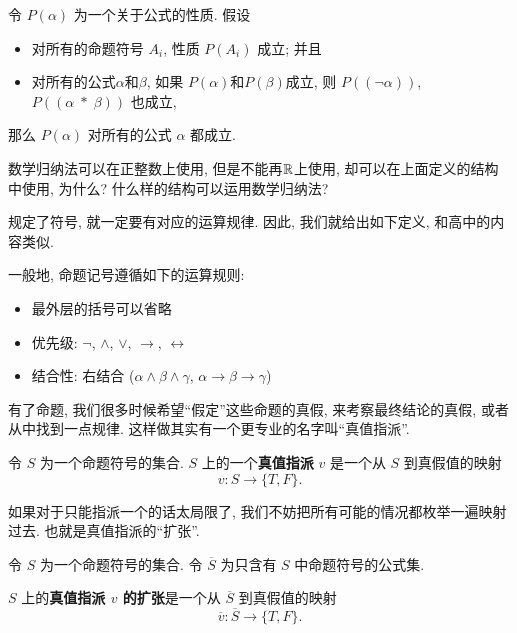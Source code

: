     \begin{theorem}[归纳原理]
        令 $P(\alpha)$ 为一个关于公式的性质. 假设
        \begin{itemize}
          \item 对所有的命题符号 $A_{i}$, 性质 $P(A_{i})$ 成立; 并且
          \item 对所有的公式$\alpha$和$\beta$, 如果 $P(\alpha)$和$P(\beta)$成立,
            则 $P((\lnot \alpha))$, $P((\alpha \;{\ast}\; \beta))$ 也成立,
        \end{itemize}
        那么 $P(\alpha)$ 对所有的公式 $\alpha$ 都成立. 
      \end{theorem}
      \begin{bonus}
        数学归纳法可以在正整数上使用, 但是不能再$\mathbb{R}$上使用, 却可以在上面定义的结构中使用, 为什么? 什么样的结构可以运用数学归纳法?
      \end{bonus}
      
      规定了符号, 就一定要有对应的运算规律. 因此, 我们就给出如下定义, 和高中的内容类似. 

      \begin{definition}[命题符号的运算规则]
        一般地, 命题记号遵循如下的运算规则: 
        \begin{itemize}
            \setlength{\itemsep}{6pt}
            \item 最外层的括号可以省略
            \item 优先级: $\lnot$, $\land$, $\lor$, $\to$, $\leftrightarrow$
            \item 结合性: 右结合 ($\alpha \land \beta \land \gamma$,
              $\alpha \to \beta \to \gamma$)
          \end{itemize}
        
      \end{definition}
      
      有了命题, 我们很多时候希望``假定''这些命题的真假, 来考察最终结论的真假, 或者从中找到一点规律. 这样做其实有一个更专业的名字叫``真值指派''. 

      \begin{definition}[真值指派 ($v$)]
        令 $S$ 为一个命题符号的集合. 
        $S$ 上的一个{\bf 真值指派} $v$ 是一个从 $S$ 到真假值的映射
        \[
          v: S \to \{T, F\}.
        \]
      \end{definition}

      如果对于只能指派一个的话太局限了, 我们不妨把所有可能的情况都枚举一遍映射过去. 也就是真值指派的``扩张''.

      \begin{definition}
        令 $S$ 为一个命题符号的集合. 
        令 $\overline{S}$ 为只含有 $S$ 中命题符号的公式集. 
    
        $S$ 上的{\bf 真值指派 $v$ 的扩张}是一个从 $\overline{S}$ 到真假值的映射
        \[
          \overline{v}: \overline{S} \to \{T, F\}.
        \]
      \end{definition}

